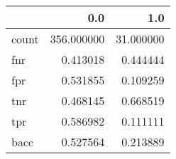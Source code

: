 \begin{tabular}{lrr}
\toprule
{} &         0.0 &        1.0 \\
\midrule
count &  356.000000 &  31.000000 \\
fnr   &    0.413018 &   0.444444 \\
fpr   &    0.531855 &   0.109259 \\
tnr   &    0.468145 &   0.668519 \\
tpr   &    0.586982 &   0.111111 \\
bacc  &    0.527564 &   0.213889 \\
\bottomrule
\end{tabular}

